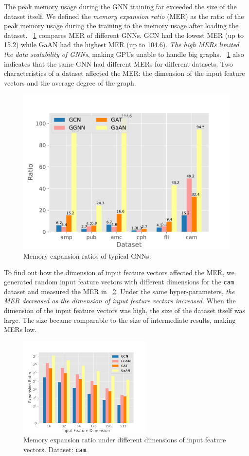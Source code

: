 The peak memory usage during the GNN training far exceeded the size of the dataset itself.
%
We defined the \emph{memory expansion ratio} (MER) as the ratio of the peak memory usage during the training to the memory usage after loading the dataset.
%
\figurename~\ref{fig:exp_memory_expansion_ratio} compares MER of different GNNs.
%
GCN had the lowest MER (up to 15.2) while GaAN had the highest MER (up to 104.6).
%
\emph{The high MERs limited the data scalability of GNNs}, making GPUs unable to handle big graphs.
%
\figurename~\ref{fig:exp_memory_expansion_ratio} also indicates that the same GNN had different MERs for different datasets.
%
Two characteristics of a dataset affected the MER: the dimension of the input feature vectors and the average degree of the graph.

\begin{figure}[H]
    \centering
    \includegraphics[width=0.5\columnwidth]{figs/experiments/exp_memory_expansion_ratio.pdf}
    \caption{Memory expansion ratios of typical GNNs.}
    \label{fig:exp_memory_expansion_ratio}
\end{figure}

To find out how the dimension of input feature vectors affected the MER, we generated random input feature vectors with different dimensions for the \texttt{cam} dataset and measured the MER in \figurename~\ref{fig:exp_memory_expension_ratio_input_feature_dimension}.
%
Under the same hyper-parameters, \emph{the MER decreased as the dimension of input feature vectors increased}.
%
When the dimension of the input feature vectors was high, the size of the dataset itself was large.
%
The size became comparable to the size of intermediate results, making MERs low.


\begin{figure}[H]
    \centering
    \includegraphics[height=5cm]{figs/experiments/exp_memory_expansion_ratio_input_feature_dimension_com-amazon.pdf}
    \caption{Memory expansion ratio under different dimensions of input feature vectors. Dataset: \texttt{cam}.}
    \label{fig:exp_memory_expension_ratio_input_feature_dimension}
\end{figure}

